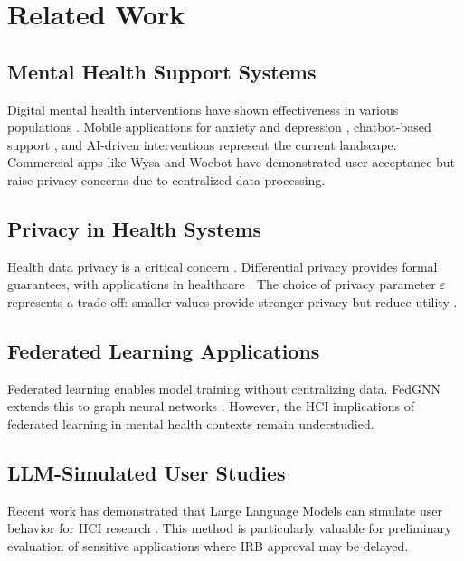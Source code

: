 \documentclass[preprint,12pt]{elsarticle}
\begin{document}
\section{Related Work}

\subsection{Mental Health Support Systems}

Digital mental health interventions have shown effectiveness in various
populations \citep{digihealth2018}. Mobile applications for anxiety and depression
\citep{mhapps2021}, chatbot-based support \citep{chatbot2020}, and AI-driven
interventions \citep{aimh2019} represent the current landscape. Commercial apps
like Wysa and Woebot have demonstrated user acceptance but raise privacy concerns
due to centralized data processing.

\subsection{Privacy in Health Systems}

Health data privacy is a critical concern \citep{privacyhealth2020}. Differential
privacy \citep{dwork2014algorithmic} provides formal guarantees, with applications
in healthcare \citep{fedhealth2019}. The choice of privacy parameter $\varepsilon$
represents a trade-off: smaller values provide stronger privacy but reduce utility
\citep{abadi2016deep}.

\subsection{Federated Learning Applications}

Federated learning \citep{mcmahan2017communication} enables model training without
centralizing data. FedGNN extends this to graph neural networks \citep{zhang2021fedgnn}.
However, the HCI implications of federated learning in mental health contexts remain
understudied.

\subsection{LLM-Simulated User Studies}

Recent work has demonstrated that Large Language Models can simulate user behavior
for HCI research \citep{horton2023llm}. This method is particularly valuable for
preliminary evaluation of sensitive applications where IRB approval may be delayed.
\end{document}
